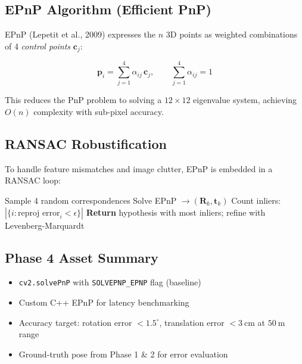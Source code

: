 \documentclass[12pt, a4paper]{article}
\begin{document}
\subsection{EPnP Algorithm (Efficient PnP)}

EPnP (Lepetit et al., 2009) expresses the $n$ 3D points as weighted
combinations of 4 \emph{control points} $\mathbf{c}_j$:

\begin{equation}
\mathbf{p}_i = \sum_{j=1}^{4} \alpha_{ij}\, \mathbf{c}_j, \qquad
\sum_{j=1}^{4} \alpha_{ij} = 1
\end{equation}

This reduces the PnP problem to solving a $12 \times 12$ eigenvalue system,
achieving $O(n)$ complexity with sub-pixel accuracy.

\subsection{RANSAC Robustification}

To handle feature mismatches and image clutter, EPnP is embedded in a
RANSAC loop:

\begin{algorithm}[H]
\caption{RANSAC-EPnP Pose Estimation}
\begin{algorithmic}[1]
    \State Sample 4 random correspondences
    \State Solve EPnP $\to (\mathbf{R}_k, \mathbf{t}_k)$
    \State Count inliers: $|\{i : \text{reproj error}_i < \epsilon\}|$
\EndFor
\State \textbf{Return} hypothesis with most inliers; refine with Levenberg-Marquardt
\end{algorithmic}
\end{algorithm}

\subsection{Phase 4 Asset Summary}
\begin{assetbox}[title=Phase 4 Assets]
\begin{itemize}[leftmargin=1.5em, itemsep=2pt]
    \item \texttt{cv2.solvePnP} with \texttt{SOLVEPNP\_EPNP} flag (baseline)
    \item Custom C++ EPnP for latency benchmarking
    \item Accuracy target: rotation error $< 1.5^\circ$,
          translation error $< 3\ \mathrm{cm}$ at $50\ \mathrm{m}$ range
    \item Ground-truth pose from Phase 1 \& 2 for error evaluation
\end{itemize}
\end{assetbox}
\end{document}
